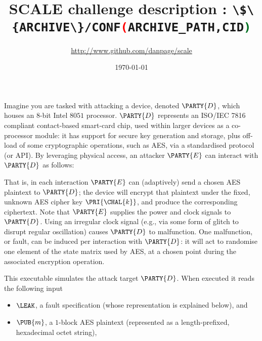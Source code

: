 \documentclass[crop={false},multi={true},tikz={true}]{standalone}
\begin{document}
\ifstandalone
\author{\url{http://www.github.com/danpage/scale}}
\title{\Large SCALE challenge description : \lstinline[language={bash}]|\$\{ARCHIVE\}/CONF(ARCHIVE_PATH,CID)|}
\date{\today}

\maketitle
\fi



Imagine you are tasked with attacking a device, denoted $\PARTY{D}$, 
which houses an $8$-bit Intel $8051$ processor.
$\PARTY{D}$ represents an ISO/IEC 7816 compliant contact-based smart-card
chip, used within larger devices as a co-processor module: it has support
for secure key generation and storage, plus off-load of some cryptographic 
operations, such as AES, via a standardised protocol (or API).
By leveraging physical access, 
an attacker $\PARTY{E}$ can interact with $\PARTY{D}$ as follows:

\begin{center}

\end{center}

\noindent
That is, in each interaction $\PARTY{E}$ can (adaptively) send 
a chosen AES  plaintext
to $\PARTY{D}$; the device will
encrypt that  plaintext under the fixed, unknown AES cipher key $\PRI{\CHAL{k}}$,
and produce 
the corresponding ciphertext.
Note that $\PARTY{E}$ supplies the power and clock signals to $\PARTY{D}$.
Using an irregular clock signal (e.g., via some form of glitch to disrupt 
regular oscillation) causes $\PARTY{D}$ to malfunction.  One malfunction, 
or fault, can be induced per interaction with $\PARTY{D}$: it will act to 
randomise one element of the state matrix used by AES, at a chosen point 
during the associated encryption operation.



This executable simulates the attack target $\PARTY{D}$.  When executed it 
reads the following input

\begin{itemize}
\item $\LEAK$, 
      a  fault specification
      (whose representation is explained below),
      and
\item $\PUB{m}$,
      a  ${1}$-block AES plaintext
      (represented as a  length-prefixed, hexadecimal octet   string),
\end{itemize}
\end{document}

